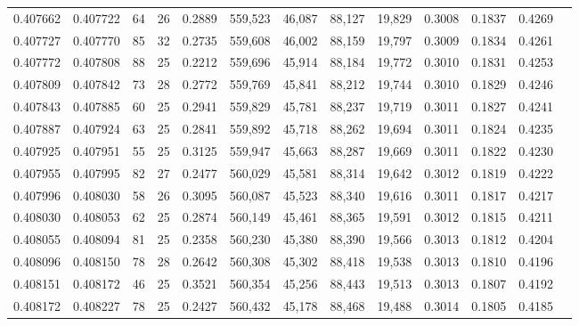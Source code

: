 \begin{tabular}{rrrrrrrrrrrrr}
0.407662 & 0.407722 &    64 &  26 &                                     0.2889 & 559,523 &  46,087 &  88,127 &  19,829 & 0.3008 & 0.1837 & 0.4269 \\
0.407727 & 0.407770 &    85 &  32 &                                     0.2735 & 559,608 &  46,002 &  88,159 &  19,797 & 0.3009 & 0.1834 & 0.4261 \\
0.407772 & 0.407808 &    88 &  25 &                                     0.2212 & 559,696 &  45,914 &  88,184 &  19,772 & 0.3010 & 0.1831 & 0.4253 \\
0.407809 & 0.407842 &    73 &  28 &                                     0.2772 & 559,769 &  45,841 &  88,212 &  19,744 & 0.3010 & 0.1829 & 0.4246 \\
0.407843 & 0.407885 &    60 &  25 &                                     0.2941 & 559,829 &  45,781 &  88,237 &  19,719 & 0.3011 & 0.1827 & 0.4241 \\
0.407887 & 0.407924 &    63 &  25 &                                     0.2841 & 559,892 &  45,718 &  88,262 &  19,694 & 0.3011 & 0.1824 & 0.4235 \\
0.407925 & 0.407951 &    55 &  25 &                                     0.3125 & 559,947 &  45,663 &  88,287 &  19,669 & 0.3011 & 0.1822 & 0.4230 \\
0.407955 & 0.407995 &    82 &  27 &                                     0.2477 & 560,029 &  45,581 &  88,314 &  19,642 & 0.3012 & 0.1819 & 0.4222 \\
0.407996 & 0.408030 &    58 &  26 &                                     0.3095 & 560,087 &  45,523 &  88,340 &  19,616 & 0.3011 & 0.1817 & 0.4217 \\
0.408030 & 0.408053 &    62 &  25 &                                     0.2874 & 560,149 &  45,461 &  88,365 &  19,591 & 0.3012 & 0.1815 & 0.4211 \\
0.408055 & 0.408094 &    81 &  25 &                                     0.2358 & 560,230 &  45,380 &  88,390 &  19,566 & 0.3013 & 0.1812 & 0.4204 \\
0.408096 & 0.408150 &    78 &  28 &                                     0.2642 & 560,308 &  45,302 &  88,418 &  19,538 & 0.3013 & 0.1810 & 0.4196 \\
0.408151 & 0.408172 &    46 &  25 &                                     0.3521 & 560,354 &  45,256 &  88,443 &  19,513 & 0.3013 & 0.1807 & 0.4192 \\
0.408172 & 0.408227 &    78 &  25 &                                     0.2427 & 560,432 &  45,178 &  88,468 &  19,488 & 0.3014 & 0.1805 & 0.4185 \\

\end{tabular}
